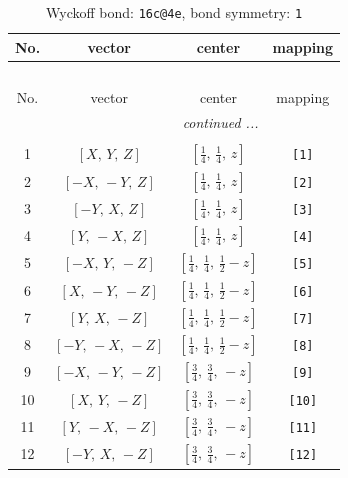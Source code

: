 \documentclass[fleqn,8pt]{jsarticle}
\begin{document}
\begin{longtable}{cccc}
\caption{Wyckoff bond: {\tt 16c@4e}, bond symmetry: {\tt 1}}
 \\
 \hline \hline
No. & vector & center & mapping \\ \hline \endfirsthead

\multicolumn{3}{l}{\tablename\ \thetable{}} \\
 \hline \hline
No. & vector & center & mapping \\ \hline \endhead

 \hline \hline
\multicolumn{3}{r}{\footnotesize\it continued ...} \\ \endfoot

 \hline \hline
\multicolumn{3}{r}{} \\ \endlastfoot

1 & $\left[ X,\, Y,\, Z \right]$ & $\left[ \frac{1}{4},\, \frac{1}{4},\, z \right]$ & {\tt [1]} \\ \hline
2 & $\left[ - X,\, - Y,\, Z \right]$ & $\left[ \frac{1}{4},\, \frac{1}{4},\, z \right]$ & {\tt [2]} \\ \hline
3 & $\left[ - Y,\, X,\, Z \right]$ & $\left[ \frac{1}{4},\, \frac{1}{4},\, z \right]$ & {\tt [3]} \\ \hline
4 & $\left[ Y,\, - X,\, Z \right]$ & $\left[ \frac{1}{4},\, \frac{1}{4},\, z \right]$ & {\tt [4]} \\ \hline
5 & $\left[ - X,\, Y,\, - Z \right]$ & $\left[ \frac{1}{4},\, \frac{1}{4},\, \frac{1}{2} - z \right]$ & {\tt [5]} \\ \hline
6 & $\left[ X,\, - Y,\, - Z \right]$ & $\left[ \frac{1}{4},\, \frac{1}{4},\, \frac{1}{2} - z \right]$ & {\tt [6]} \\ \hline
7 & $\left[ Y,\, X,\, - Z \right]$ & $\left[ \frac{1}{4},\, \frac{1}{4},\, \frac{1}{2} - z \right]$ & {\tt [7]} \\ \hline
8 & $\left[ - Y,\, - X,\, - Z \right]$ & $\left[ \frac{1}{4},\, \frac{1}{4},\, \frac{1}{2} - z \right]$ & {\tt [8]} \\ \hline
9 & $\left[ - X,\, - Y,\, - Z \right]$ & $\left[ \frac{3}{4},\, \frac{3}{4},\, - z \right]$ & {\tt [9]} \\ \hline
10 & $\left[ X,\, Y,\, - Z \right]$ & $\left[ \frac{3}{4},\, \frac{3}{4},\, - z \right]$ & {\tt [10]} \\ \hline
11 & $\left[ Y,\, - X,\, - Z \right]$ & $\left[ \frac{3}{4},\, \frac{3}{4},\, - z \right]$ & {\tt [11]} \\ \hline
12 & $\left[ - Y,\, X,\, - Z \right]$ & $\left[ \frac{3}{4},\, \frac{3}{4},\, - z \right]$ & {\tt [12]} \\ \hline

\end{longtable}
\end{document}
